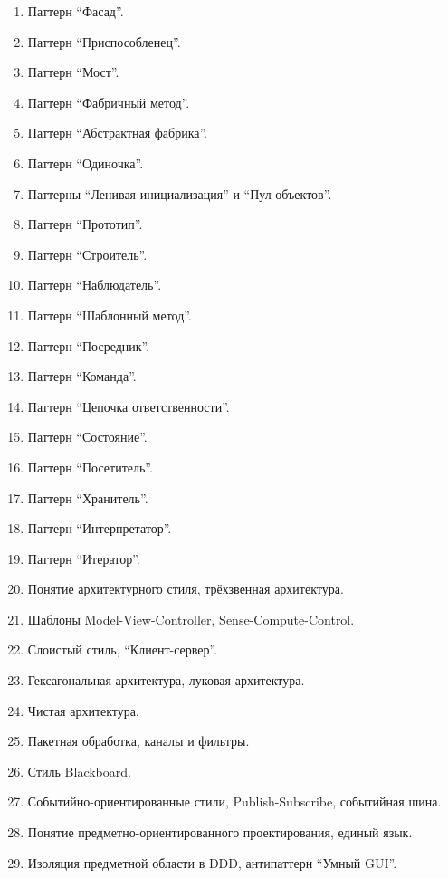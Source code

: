 \documentclass[a5paper]{article}
\begin{document}
\begin{enumerate}
    \item Паттерн \enquote{Фасад}.
    \item Паттерн \enquote{Приспособленец}.
    \item Паттерн \enquote{Мост}.
    \item Паттерн \enquote{Фабричный метод}.
    \item Паттерн \enquote{Абстрактная фабрика}.
    \item Паттерн \enquote{Одиночка}.
    \item Паттерны \enquote{Ленивая инициализация} и \enquote{Пул объектов}.
    \item Паттерн \enquote{Прототип}.
    \item Паттерн \enquote{Строитель}.
    \item Паттерн \enquote{Наблюдатель}.
    \item Паттерн \enquote{Шаблонный метод}.
    \item Паттерн \enquote{Посредник}.
    \item Паттерн \enquote{Команда}.
    \item Паттерн \enquote{Цепочка ответственности}.
    \item Паттерн \enquote{Состояние}.
    \item Паттерн \enquote{Посетитель}.
    \item Паттерн \enquote{Хранитель}.
    \item Паттерн \enquote{Интерпретатор}.
    \item Паттерн \enquote{Итератор}.
    \item Понятие архитектурного стиля, трёхзвенная архитектура.
    \item Шаблоны Model-View-Controller, Sense-Compute-Control.
    \item Слоистый стиль, \enquote{Клиент-сервер}.
    \item Гексагональная архитектура, луковая архитектура.
    \item Чистая архитектура.
    \item Пакетная обработка, каналы и фильтры. 
    \item Стиль Blackboard.
    \item Событийно-ориентированные стили, Publish-Subscribe, событийная шина.
    \item Понятие предметно-ориентированного проектирования, единый язык.
    \item Изоляция предметной области в DDD, антипаттерн \enquote{Умный GUI}.

\end{enumerate}
\end{document}
